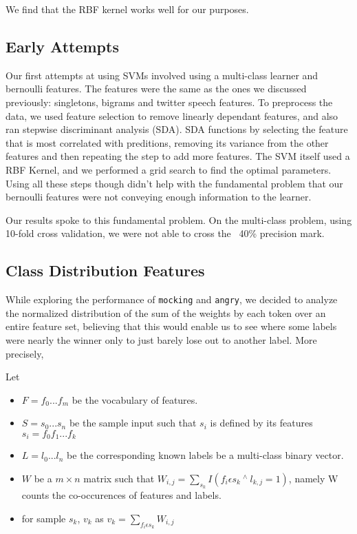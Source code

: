 \documentclass[11pt]{article}
\begin{document}
We find that the RBF kernel works well for our purposes.

\subsection{Early Attempts}

Our first attempts at using SVMs involved using a multi-class learner and bernoulli features. The features were the same as the ones we discussed previously: singletons, bigrams and twitter speech features. To preprocess the data, we used feature selection to remove linearly dependant features, and also ran stepwise discriminant analysis (SDA). SDA functions by selecting the feature that is most correlated with preditions, removing its variance from the other features and then repeating the step to add more features. The SVM itself used a RBF Kernel, and we performed a grid search to find the optimal parameters. Using all these steps though didn't help with the fundamental problem that our bernoulli features were not conveying enough information to the learner.

Our results spoke to this fundamental problem. On the multi-class problem, using 10-fold cross validation, we were not able to cross the ~40\% precision mark.

\subsection{Class Distribution Features}

While exploring the performance of \verb|mocking| and \verb|angry|, we decided to analyze the normalized distribution of the sum of the weights by each token over an entire feature set, believing that this would enable us to see where some labels were nearly the winner only to just barely lose out to another label. More precisely,

Let
\begin{itemize}
\item $F = {f_{0}...f_{m}}$ be the vocabulary of features.
\item $S = {s_{0}...s_{n}}$ be the sample input such that $s_{i}$ is defined by its features $s_{i} = f_{0}f_{1}...f_{k}$ 
\item $L = {l_{0}...l_{n}}$ be the corresponding known labels be a multi-class binary vector.
\item $W$ be a $m \times n$ matrix such that $W_{i,j} = \sum_{s_{k} } I(f_{i} \epsilon s_{k}\ ^{\wedge}\ l_{k,j} = 1)$, namely W counts the co-occurences of features and labels.

\item for sample $s_{k}$, $v_{k}$ as 
$v_{k}=\sum_{f_{i}\epsilon s_{k}} W_{i,j}$
\end{itemize}
\end{document}
